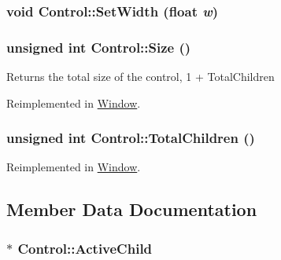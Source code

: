 \hypertarget{class_control_eef729e67952600e2ed998147d330eb6}{
\subsubsection[{SetWidth}]{\setlength{\rightskip}{0pt plus 5cm}void Control::SetWidth (float {\em w})}}
\label{class_control_eef729e67952600e2ed998147d330eb6}


\hypertarget{class_control_b71295cb3f212dcc92672028155ffb7d}{
\subsubsection[{Size}]{\setlength{\rightskip}{0pt plus 5cm}unsigned int Control::Size ()}}
\label{class_control_b71295cb3f212dcc92672028155ffb7d}


Returns the total size of the control, 1 + TotalChildren 

Reimplemented in \hyperlink{class_window_7b5200a4b20ba5a0bafc43ec1207125b}{Window}.\hypertarget{class_control_ed5bd5da33b1e7007877a777c2c0eddb}{
\subsubsection[{TotalChildren}]{\setlength{\rightskip}{0pt plus 5cm}unsigned int Control::TotalChildren ()}}
\label{class_control_ed5bd5da33b1e7007877a777c2c0eddb}




Reimplemented in \hyperlink{class_window_16719560d4f63b07aa4c554bfb1c9cdd}{Window}.

\subsection{Member Data Documentation}
\hypertarget{class_control_10aad05127f14123e168c4ff1c2803ba}{
\subsubsection[{ActiveChild}]{$\ast$ {\bf Control::ActiveChild}}}
\label{class_control_10aad05127f14123e168c4ff1c2803ba}


